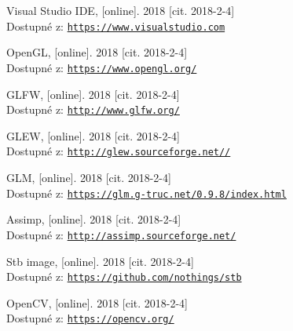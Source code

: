 \documentclass[czech,public,dept460,male,cpdeclaration]{diploma}
\begin{document}
\begin{thebibliography}{99}
	 Visual Studio IDE,
		[online]. 2018 [cit. 2018-2-4]\\
		Dostupné z: \href{https://www.visualstudio.com}{\texttt{https://www.visualstudio.com}}
		
	 OpenGL,
		[online]. 2018 [cit. 2018-2-4]\\
		Dostupné z: \href{https://www.opengl.org/}{\texttt{https://www.opengl.org/}}
		
	 GLFW,
		[online]. 2018 [cit. 2018-2-4]\\
		Dostupné z: \href{http://www.glfw.org/}{\texttt{http://www.glfw.org/}}
		
	 GLEW,
		[online]. 2018 [cit. 2018-2-4]\\
		Dostupné z: \href{http://glew.sourceforge.net/}{\texttt{http://glew.sourceforge.net//}}
		
	 GLM,
		[online]. 2018 [cit. 2018-2-4]\\
		Dostupné z: \href{https://glm.g-truc.net/0.9.8/index.html}{\texttt{https://glm.g-truc.net/0.9.8/index.html}}
		
	 Assimp,
		[online]. 2018 [cit. 2018-2-4]\\
		Dostupné z: \href{http://assimp.sourceforge.net/}{\texttt{http://assimp.sourceforge.net/}}
		
	 Stb image,
		[online]. 2018 [cit. 2018-2-4]\\
		Dostupné z: \href{https://github.com/nothings/stb}{\texttt{https://github.com/nothings/stb}}
		
	 OpenCV,
		[online]. 2018 [cit. 2018-2-4]\\
		Dostupné z: \href{https://opencv.org/}{\texttt{https://opencv.org/}}
		
\end{thebibliography}



\end{document}

